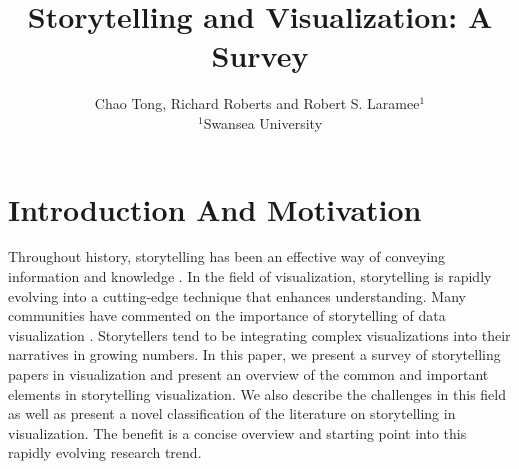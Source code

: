 \documentclass{egpubl}
\begin{document}
\title[Storytelling and Visualization: A Survey]%
      {Storytelling and Visualization: A Survey}

\author[C.Tong \& R.Roberts \& R.S.Laramee]
       {Chao Tong, Richard Roberts
        and Robert S. Laramee$^{1}$
        \\
        $^1$Swansea University
       }

\maketitle

\section{Introduction And Motivation}

Throughout history, storytelling has been an effective way of conveying information and knowledge \cite{Lidal2013}. In the field of visualization, storytelling is rapidly evolving into a cutting-edge technique that enhances understanding. Many communities have commented on the importance of storytelling of data visualization \cite{segal}. Storytellers tend to be integrating complex visualizations into their narratives in growing numbers. In this paper, we present a survey of storytelling papers in visualization and present an overview of the common and important elements in storytelling visualization. We also describe the challenges in this field as well as present a novel classification of the literature on storytelling in visualization. The benefit is a concise overview and starting point into this rapidly evolving research trend. 
\end{document}

